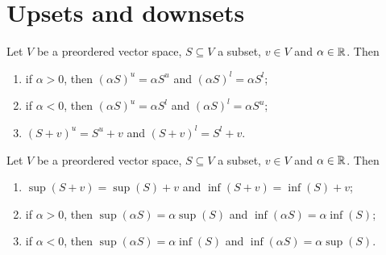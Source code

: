 \section{Upsets and downsets}
\begin{lemma} \label{sumMultipleUpDownsets}
Let $V$ be a preordered vector space, $S\subseteq V$ a subset, $v\in V$ and $\alpha\in \mathbb{R}$. Then
\begin{enumerate}
\item if $\alpha > 0$, then $(\alpha S)^u = \alpha S^u$ and $(\alpha S)^l = \alpha S^l$;
\item if $\alpha < 0$, then $(\alpha S)^u = \alpha S^l$ and $(\alpha S)^l = \alpha S^u$;
\item $(S+v)^u = S^u + v$ and $(S+v)^l = S^l + v$.
\end{enumerate}
\end{lemma}
\begin{corollary}
Let $V$ be a preordered vector space, $S\subseteq V$ a subset, $v\in V$ and $\alpha\in \mathbb{R}$. Then
\begin{enumerate}
\item $\sup(S+v) = \sup(S)+v$ and $\inf(S+v) = \inf(S)+v$;
\item if $\alpha > 0$, then $\sup(\alpha S) = \alpha \sup(S)$ and $\inf(\alpha S) = \alpha \inf(S)$;
\item if $\alpha < 0$, then $\sup(\alpha S) = \alpha \inf(S)$ and $\inf(\alpha S) = \alpha \sup(S)$.
\end{enumerate}
\end{corollary}

